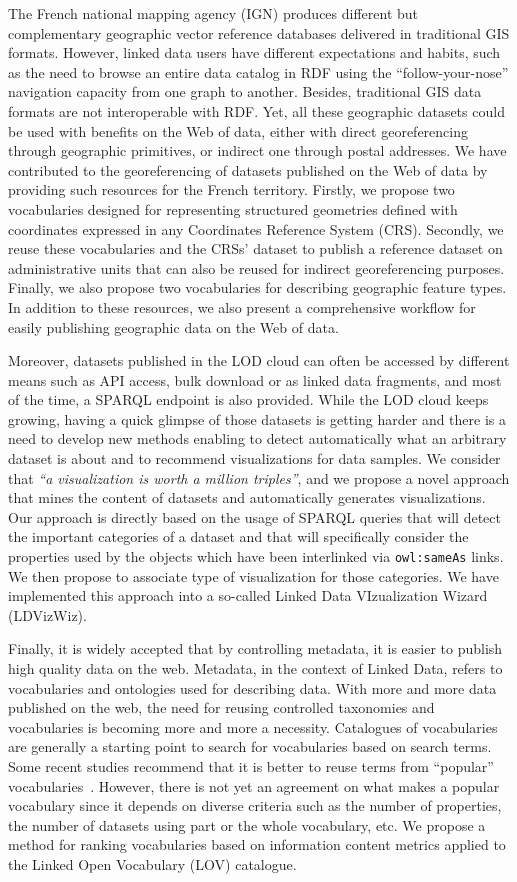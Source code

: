 
The French national mapping agency (IGN) produces different but complementary geographic vector reference databases delivered in traditional GIS formats. However, linked data users have different expectations and habits, such as the need to browse an entire data catalog in RDF using the ``follow-your-nose'' navigation capacity from one graph to another. Besides, traditional GIS data formats are not interoperable with RDF. Yet, all these geographic datasets could be used with benefits on the Web of data, either with direct georeferencing through geographic primitives, or indirect one through postal addresses.
We have contributed to the georeferencing of datasets published on the Web of data by providing such resources for the French territory. Firstly, we propose two vocabularies designed for representing structured geometries defined with coordinates expressed in any Coordinates Reference System (CRS). Secondly, we reuse these vocabularies and the CRSs' dataset to publish a reference dataset on administrative units that can also be reused for indirect georeferencing purposes. Finally, we also propose two vocabularies for describing geographic feature types. In addition to these resources, we also present a comprehensive workflow for easily publishing geographic data on the Web of data.


Moreover, datasets published in the LOD cloud can often be accessed by different means such as API access, bulk download or as linked data fragments, and most of the time, a SPARQL endpoint is also provided. While the LOD cloud keeps growing, having a quick glimpse of those datasets is getting harder and there is a need to develop new methods enabling to detect automatically what an arbitrary dataset is about and to recommend visualizations for data samples. We consider that \textit{``a visualization is worth a million triples''}, and  we propose a novel approach that mines the content of datasets and automatically generates visualizations. Our approach is directly based on the usage of SPARQL queries that will detect the important categories of a dataset and that will specifically consider the properties used by the objects which have been interlinked via \texttt{owl:sameAs} links. We then propose to associate type of visualization for those categories. We have implemented this approach into a so-called Linked Data VIzualization Wizard (LDVizWiz).

Finally, it is widely accepted that by controlling metadata, it is easier to publish high quality data on the web. Metadata, in the context of Linked Data, refers to vocabularies and ontologies used for describing data. With more and more data published on the web, the need for reusing controlled taxonomies and vocabularies is becoming more and more a necessity. Catalogues of vocabularies are generally a starting point to search for vocabularies based on search terms. Some recent studies recommend that it is better to reuse terms from ``popular'' vocabularies~\cite{krzysztof14}. However, there is not yet an agreement on what makes a popular vocabulary since it depends on diverse criteria such as the number of properties, the number of datasets using part or the whole vocabulary, etc. We propose a method for ranking vocabularies based on information content metrics applied to the Linked Open Vocabulary (LOV) catalogue.